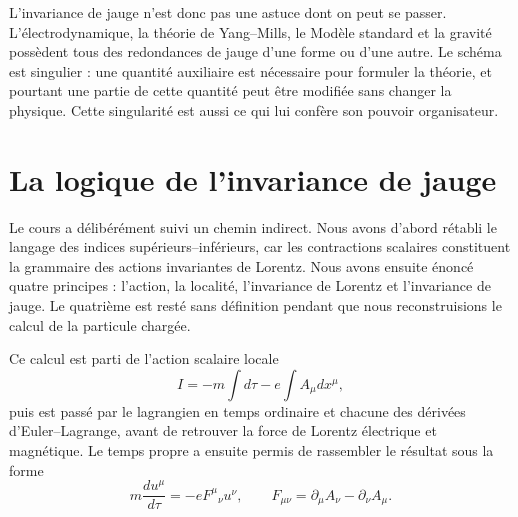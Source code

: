 \begin{classroomqa}
\end{classroomqa}

\begin{classroomqa}
\end{classroomqa}

L’invariance de jauge n’est donc pas une astuce dont on peut se passer. L’électrodynamique, la théorie de Yang--Mills, le Modèle standard et la gravité possèdent tous des redondances de jauge d’une forme ou d’une autre. Le schéma est singulier : une quantité auxiliaire est nécessaire pour formuler la théorie, et pourtant une partie de cette quantité peut être modifiée sans changer la physique. Cette singularité est aussi ce qui lui confère son pouvoir organisateur.

\section{La logique de l’invariance de jauge}

Le cours a délibérément suivi un chemin indirect. Nous avons d’abord rétabli le langage des indices supérieurs--inférieurs, car les contractions scalaires constituent la grammaire des actions invariantes de Lorentz. Nous avons ensuite énoncé quatre principes : l’action, la localité, l’invariance de Lorentz et l’invariance de jauge. Le quatrième est resté sans définition pendant que nous reconstruisions le calcul de la particule chargée.

Ce calcul est parti de l’action scalaire locale
\begin{equation}
I
=
-m\int d\tau
-e\int A_\mu dx^\mu,
\end{equation}
puis est passé par le lagrangien en temps ordinaire et chacune des dérivées d’Euler--Lagrange, avant de retrouver la force de Lorentz électrique et magnétique. Le temps propre a ensuite permis de rassembler le résultat sous la forme
\begin{equation}
m\frac{du^\mu}{d\tau}
=
-eF^\mu{}_\nu u^\nu,
\qquad
F_{\mu\nu}
=
\partial_\mu A_\nu-\partial_\nu A_\mu.
\end{equation}

